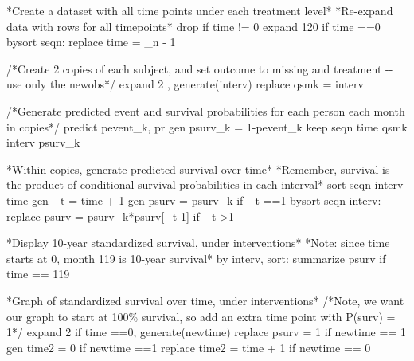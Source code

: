 \documentclass[
  10pt,
  a4paper,
]{book}
\newenvironment{Shaded}{\begin{snugshade}}{\end{snugshade}}
\newcommand{\BaseNTok}[1]{\textcolor[rgb]{0.68,0.00,0.00}{#1}}
\newcommand{\CommentTok}[1]{\textcolor[rgb]{0.37,0.37,0.37}{#1}}
\newcommand{\DataTypeTok}[1]{\textcolor[rgb]{0.68,0.00,0.00}{#1}}
\newcommand{\DecValTok}[1]{\textcolor[rgb]{0.68,0.00,0.00}{#1}}
\newcommand{\FunctionTok}[1]{\textcolor[rgb]{0.28,0.35,0.67}{#1}}
\newcommand{\KeywordTok}[1]{\textcolor[rgb]{0.00,0.46,0.62}{#1}}
\newcommand{\NormalTok}[1]{\textcolor[rgb]{0.00,0.46,0.62}{#1}}
\newcommand{\OtherTok}[1]{\textcolor[rgb]{0.00,0.46,0.62}{#1}}
\begin{document}
\begin{Shaded}
\begin{Highlighting}[]
\NormalTok{*Create a dataset with }\OtherTok{all}\NormalTok{ time points under each treatment }\DecValTok{level}\NormalTok{*}
\NormalTok{*Re{-}expand }\KeywordTok{data}\NormalTok{ with }\BaseNTok{rows} \KeywordTok{for} \OtherTok{all}\NormalTok{ timepoints*}
\KeywordTok{drop} \KeywordTok{if}\NormalTok{ time != 0}
\NormalTok{expand 120 }\KeywordTok{if}\NormalTok{ time ==0 }
\KeywordTok{bysort}\NormalTok{ seqn: }\KeywordTok{replace}\NormalTok{ time = }\DataTypeTok{\_n}\NormalTok{ {-} 1   }
        
\CommentTok{/*Create 2 copies of each subject, and set outcome to missing }
\CommentTok{and treatment {-}{-} use only the newobs*/}
\NormalTok{expand 2 , }\KeywordTok{generate}\NormalTok{(interv) }
\KeywordTok{replace}\NormalTok{ qsmk = interv   }

\CommentTok{/*Generate predicted event and survival probabilities }
\CommentTok{for each person each month in copies*/}
\KeywordTok{predict}\NormalTok{ pevent\_k, pr}
\KeywordTok{gen}\NormalTok{ psurv\_k = 1{-}pevent\_k}
\KeywordTok{keep}\NormalTok{ seqn time qsmk interv psurv\_k }

\NormalTok{*Within copies, }\KeywordTok{generate}\NormalTok{ predicted survival }\BaseNTok{over}\NormalTok{ time*}
\NormalTok{*Remember, survival is the product }\KeywordTok{of}\NormalTok{ conditional survival probabilities }\KeywordTok{in}\NormalTok{ each interval*  }
\KeywordTok{sort}\NormalTok{ seqn interv time}
\KeywordTok{gen}\NormalTok{ \_t = time + 1}
\KeywordTok{gen}\NormalTok{ psurv = psurv\_k }\KeywordTok{if}\NormalTok{ \_t ==1       }
\KeywordTok{bysort}\NormalTok{ seqn interv: }\KeywordTok{replace}\NormalTok{ psurv = psurv\_k*psurv[\_t{-}1] }\KeywordTok{if}\NormalTok{ \_t \textgreater{}1 }

\NormalTok{*Display 10{-}}\FunctionTok{year}\NormalTok{ standardized survival, under interventions*}
\NormalTok{*Note: since time starts }\FunctionTok{at}\NormalTok{ 0, }\FunctionTok{month}\NormalTok{ 119 is 10{-}}\FunctionTok{year}\NormalTok{ survival*}
\KeywordTok{by}\NormalTok{ interv, }\KeywordTok{sort}\NormalTok{: }\KeywordTok{summarize}\NormalTok{ psurv }\KeywordTok{if}\NormalTok{ time == 119}

\NormalTok{*Graph }\KeywordTok{of}\NormalTok{ standardized survival }\BaseNTok{over}\NormalTok{ time, under interventions*}
\CommentTok{/*Note, we want our graph to start at 100\% survival, }
\CommentTok{so add an extra time point with P(surv) = 1*/}
\NormalTok{expand 2 }\KeywordTok{if}\NormalTok{ time ==0, }\KeywordTok{generate}\NormalTok{(newtime)}
\KeywordTok{replace}\NormalTok{ psurv  = 1 }\KeywordTok{if}\NormalTok{ newtime == 1}
\KeywordTok{gen}\NormalTok{ time2 = 0 }\KeywordTok{if}\NormalTok{ newtime ==1}
\KeywordTok{replace}\NormalTok{ time2 = time + 1 }\KeywordTok{if}\NormalTok{ newtime == 0}


\end{Highlighting}
\end{Shaded}
\end{document}
